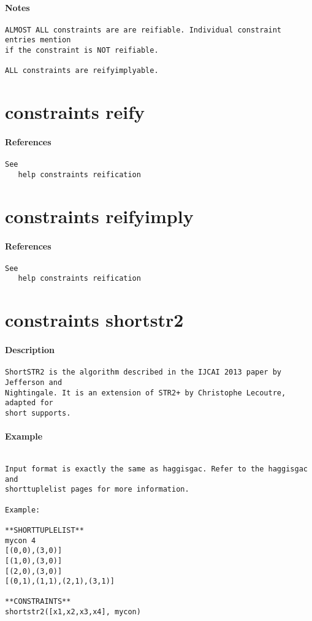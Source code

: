 \paragraph{Notes}
{\footnotesize
\begin{verbatim}
ALMOST ALL constraints are are reifiable. Individual constraint entries mention
if the constraint is NOT reifiable.

ALL constraints are reifyimplyable.
\end{verbatim}
}
\section{constraints reify}
\paragraph{References}
{\footnotesize
\begin{verbatim}
See
   help constraints reification
\end{verbatim}
}
\section{constraints reifyimply}
\paragraph{References}
{\footnotesize
\begin{verbatim}
See
   help constraints reification
\end{verbatim}
}
\section{constraints shortstr2}
\paragraph{Description}
{\footnotesize
\begin{verbatim}
ShortSTR2 is the algorithm described in the IJCAI 2013 paper by Jefferson and
Nightingale. It is an extension of STR2+ by Christophe Lecoutre, adapted for
short supports. 
\end{verbatim}
}
\paragraph{Example}
{\footnotesize
\begin{verbatim}

Input format is exactly the same as haggisgac. Refer to the haggisgac and
shorttuplelist pages for more information. 

Example:

**SHORTTUPLELIST**
mycon 4
[(0,0),(3,0)]
[(1,0),(3,0)]
[(2,0),(3,0)]
[(0,1),(1,1),(2,1),(3,1)]

**CONSTRAINTS**
shortstr2([x1,x2,x3,x4], mycon)
\end{verbatim}
}
